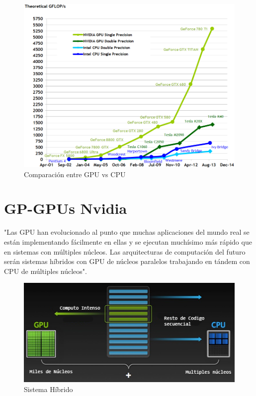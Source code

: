 \begin{figure}[ph]
			\centering
				\includegraphics[scale=0.5]{img/flops.png}
			\caption{Comparación entre GPU vs CPU}
\end{figure}


\pagebreak

\section{GP-GPUs Nvidia}

"Las GPU han evolucionado al punto que muchas aplicaciones del mundo real se están implementando fácilmente en ellas y se ejecutan muchísimo más rápido que en sistemas con múltiples núcleos. Las arquitecturas de computación del futuro serán sistemas híbridos con GPU de núcleos paralelos trabajando en tándem con CPU de múltiples núcleos".\cite{GPUIntro}

\begin{figure}[h]
			\centering
				\includegraphics[scale=1]{img/how-gpu-acceleration-works.png}
			\caption{Sistema Híbrido}
\end{figure}

